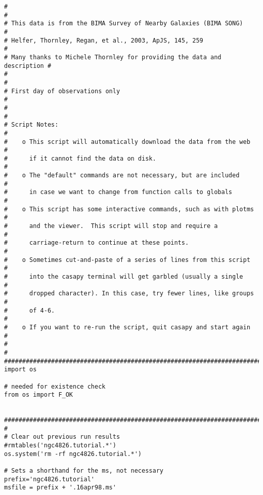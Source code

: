 \begin{verbatim}
#                                                                        #
# This data is from the BIMA Survey of Nearby Galaxies (BIMA SONG)       #
# Helfer, Thornley, Regan, et al., 2003, ApJS, 145, 259                  #
# Many thanks to Michele Thornley for providing the data and description #
#                                                                        #
# First day of observations only                                         #
#                                                                        #
# Script Notes:                                                          #
#    o This script will automatically download the data from the web     #
#      if it cannot find the data on disk.                               #
#    o The "default" commands are not necessary, but are included        #
#      in case we want to change from function calls to globals          #
#    o This script has some interactive commands, such as with plotms    #
#      and the viewer.  This script will stop and require a              #
#      carriage-return to continue at these points.                      #
#    o Sometimes cut-and-paste of a series of lines from this script     #
#      into the casapy terminal will get garbled (usually a single       #
#      dropped character). In this case, try fewer lines, like groups    #
#      of 4-6.                                                           #
#    o If you want to re-run the script, quit casapy and start again     #
#                                                                        #
##########################################################################
import os

# needed for existence check
from os import F_OK


##########################################################################
#                                                                        
# Clear out previous run results
#rmtables('ngc4826.tutorial.*')
os.system('rm -rf ngc4826.tutorial.*')

# Sets a shorthand for the ms, not necessary
prefix='ngc4826.tutorial'
msfile = prefix + '.16apr98.ms'


\end{verbatim}
